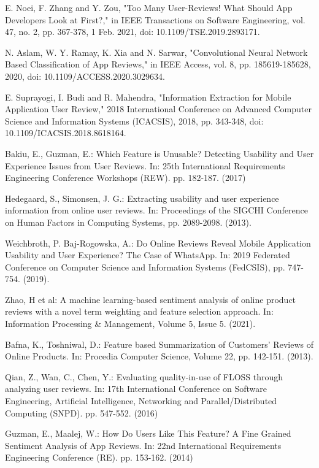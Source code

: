 \documentclass[a4paper,10pt, bibliography=totocnumbered]{scrreprt}
\begin{document}
\begin{thebibliography}{9}
E. Noei, F. Zhang and Y. Zou, "Too Many User-Reviews! What Should App Developers Look at First?," in IEEE Transactions on Software Engineering, vol. 47, no. 2, pp. 367-378, 1 Feb. 2021, doi: 10.1109/TSE.2019.2893171.

N. Aslam, W. Y. Ramay, K. Xia and N. Sarwar, "Convolutional Neural Network Based Classification of App Reviews," in IEEE Access, vol. 8, pp. 185619-185628, 2020, doi: 10.1109/ACCESS.2020.3029634.

E. Suprayogi, I. Budi and R. Mahendra, "Information Extraction for Mobile Application User Review," 2018 International Conference on Advanced Computer Science and Information Systems (ICACSIS), 2018, pp. 343-348, doi: 10.1109/ICACSIS.2018.8618164.

 Bakiu, E., Guzman, E.: Which Feature is Unusable? Detecting Usability and User Experience Issues from User Reviews.
In: 25th International Requirements Engineering Conference Workshops (REW). pp. 182-187. (2017)

 Hedegaard, S., Simonsen, J. G.: Extracting usability and user experience information from online user reviews.
In: Proceedings of the SIGCHI Conference on Human Factors in Computing Systems, pp. 2089-2098. (2013).

 Weichbroth, P. Baj-Rogowska, A.: Do Online Reviews Reveal Mobile Application Usability and User Experience? The Case of WhatsApp. In: 2019 Federated Conference on Computer Science and Information Systems (FedCSIS), pp. 747-754. (2019).

 Zhao, H et al: A machine learning-based sentiment analysis of online product reviews with a novel term weighting and feature selection approach.
In: Information Processing \& Management, Volume 5, Issue 5. (2021).

 Bafna, K., Toshniwal, D.: Feature based Summarization of Customers' Reviews of Online Products.
In: Procedia Computer Science, Volume 22, pp. 142-151. (2013).

 Qian, Z., Wan, C., Chen, Y.: Evaluating quality-in-use of FLOSS through analyzing user reviews.
In: 17th International Conference on Software Engineering, Artificial Intelligence, Networking and Parallel/Distributed Computing (SNPD). pp. 547-552. (2016)

 Guzman, E., Maalej, W.: How Do Users Like This Feature? A Fine Grained Sentiment Analysis of App Reviews.
In: 22nd International Requirements Engineering Conference (RE). pp. 153-162. (2014)


\end{thebibliography}
\end{document}
